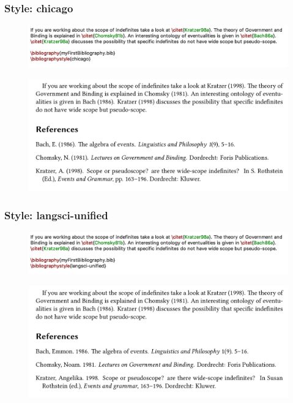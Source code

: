 \begin{frame}[fragile]
\frametitle{Style: chicago}


\begin{figure}
\centering
\includegraphics[width=.85\textwidth]{../../texfiles-beamer/tex-material/WissArb-latex/xelatex-bib-chicago}
\end{figure}

\begin{figure}
\centering
\includegraphics[width=.85\textwidth]{../../texfiles-beamer/tex-material/WissArb-latex/xelatex-bib-chicago-pdf}
\end{figure}

\end{frame}


\begin{frame}[fragile]
\frametitle{Style: langsci-unified}


\begin{figure}
\centering
\includegraphics[width=.85\textwidth]{../../texfiles-beamer/tex-material/WissArb-latex/xelatex-bib-langsciunified}
\end{figure}

\begin{figure}
\centering
\includegraphics[width=.85\textwidth]{../../texfiles-beamer/tex-material/WissArb-latex/xelatex-bib-langsciunified-pdf}
\end{figure}

\end{frame}


